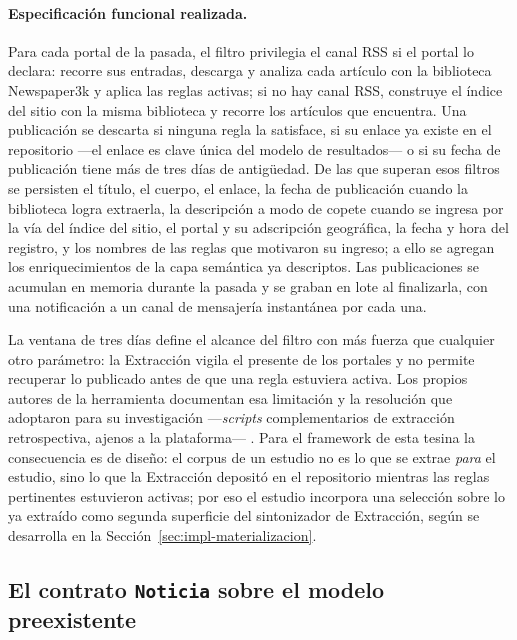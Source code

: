 \documentclass[12pt]{report}
\begin{document}
\paragraph{Especificación funcional realizada.} Para cada portal de la pasada, el filtro privilegia el canal RSS si el portal lo declara: recorre sus entradas, descarga y analiza cada artículo con la biblioteca Newspaper3k y aplica las reglas activas; si no hay canal RSS, construye el índice del sitio con la misma biblioteca y recorre los artículos que encuentra. Una publicación se descarta si ninguna regla la satisface, si su enlace ya existe en el repositorio ---el enlace es clave única del modelo de resultados--- o si su fecha de publicación tiene más de tres días de antigüedad. De las que superan esos filtros se persisten el título, el cuerpo, el enlace, la fecha de publicación cuando la biblioteca logra extraerla, la descripción a modo de copete cuando se ingresa por la vía del índice del sitio, el portal y su adscripción geográfica, la fecha y hora del registro, y los nombres de las reglas que motivaron su ingreso; a ello se agregan los enriquecimientos de la capa semántica ya descriptos. Las publicaciones se acumulan en memoria durante la pasada y se graban en lote al finalizarla, con una notificación a un canal de mensajería instantánea por cada una.

La ventana de tres días define el alcance del filtro con más fuerza que cualquier otro parámetro: la Extracción vigila el presente de los portales y no permite recuperar lo publicado antes de que una regla estuviera activa. Los propios autores de la herramienta documentan esa limitación y la resolución que adoptaron para su investigación ---\textit{scripts} complementarios de extracción retrospectiva, ajenos a la plataforma--- \citep{raimondo:2024}. Para el framework de esta tesina la consecuencia es de diseño: el corpus de un estudio no es lo que se extrae \textit{para} el estudio, sino lo que la Extracción depositó en el repositorio mientras las reglas pertinentes estuvieron activas; por eso el estudio incorpora una selección sobre lo ya extraído como segunda superficie del sintonizador de Extracción, según se desarrolla en la Sección~\ref{sec:impl-materializacion}.

\subsection{El contrato \texttt{Noticia} sobre el modelo preexistente}
\label{sec:impl-pre-noticia}
\end{document}
